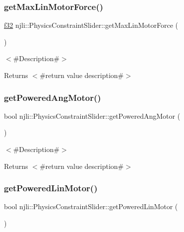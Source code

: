 \subsubsection{\texorpdfstring{get\+Max\+Lin\+Motor\+Force()}{getMaxLinMotorForce()}}
{\footnotesize\ttfamily \mbox{\hyperlink{_util_8h_a5f6906312a689f27d70e9d086649d3fd}{f32}} njli\+::\+Physics\+Constraint\+Slider\+::get\+Max\+Lin\+Motor\+Force (\begin{DoxyParamCaption}{ }\end{DoxyParamCaption})}

$<$\#\+Description\#$>$

\begin{DoxyReturn}{Returns}
$<$\#return value description\#$>$ 
\end{DoxyReturn}
\mbox{\label{classnjli_1_1_physics_constraint_slider_a6ad2fb16e03ebf5f93a83f762de206d9}} 
\subsubsection{\texorpdfstring{get\+Powered\+Ang\+Motor()}{getPoweredAngMotor()}}
{\footnotesize\ttfamily bool njli\+::\+Physics\+Constraint\+Slider\+::get\+Powered\+Ang\+Motor (\begin{DoxyParamCaption}{ }\end{DoxyParamCaption})}

$<$\#\+Description\#$>$

\begin{DoxyReturn}{Returns}
$<$\#return value description\#$>$ 
\end{DoxyReturn}
\mbox{\label{classnjli_1_1_physics_constraint_slider_a7516538fdd1c4defda6def5290e93eb8}} 
\subsubsection{\texorpdfstring{get\+Powered\+Lin\+Motor()}{getPoweredLinMotor()}}
{\footnotesize\ttfamily bool njli\+::\+Physics\+Constraint\+Slider\+::get\+Powered\+Lin\+Motor (\begin{DoxyParamCaption}{ }\end{DoxyParamCaption})}


